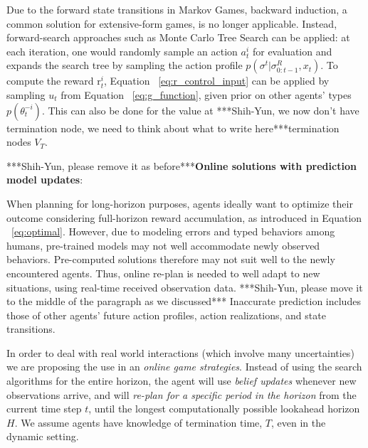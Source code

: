 \documentclass[letterpaper, 10 pt, conference]{ieeeconf}  %
\begin{document}
Due to the forward state transitions in Markov Games, backward induction, a common solution for extensive-form games, is no longer applicable. Instead, forward-search approaches such as Monte Carlo Tree Search can be applied: at each iteration, one would randomly sample an action $a^i_t$ for evaluation and expands the search 
tree by sampling the action profile $p(\sigma^t|\sigma^R_{0:t-1},x_t)$. To compute the reward r$^i_t$, Equation ~\ref{eq:r_control_input} can be applied by sampling $u_t$ from Equation ~\ref{eq:g_function}, given prior on other agents' types $p(\theta^{-i}_t)$. This can also be done for the value at ***Shih-Yun, we now don't have termination node, we need to think about what to write here***termination nodes $V_T$.

***Shih-Yun, please remove it as before***\textbf{Online solutions with prediction model updates}:

When planning for long-horizon purposes, agents ideally want to optimize their 
outcome considering full-horizon reward accumulation, as introduced in Equation 
~\ref{eq:optimal}. However, due to modeling errors and typed behaviors among 
humans, pre-trained models may not well accommodate newly observed behaviors. 
Pre-computed solutions therefore may not suit well to the newly 
encountered agents. Thus, online re-plan is needed to well adapt to new 
situations, using real-time received observation data. 
***Shih-Yun, please move it to the middle of the paragraph as we discussed*** Inaccurate prediction includes those of other agents' future action profiles, action realizations, and state transitions. 

In order to deal with real world interactions (which involve many uncertainties) we are proposing the use in an \textit{online game 
strategies}. Instead of using the search algorithms for the entire 
horizon, the agent will use \textit{belief updates} whenever new 
observations arrive, and will \textit{re-plan for a specific period in the horizon} from the current time step $t$, until the longest computationally possible lookahead horizon $H$. We assume agents have knowledge of termination time, $T$, even in the dynamic setting.
\end{document}
